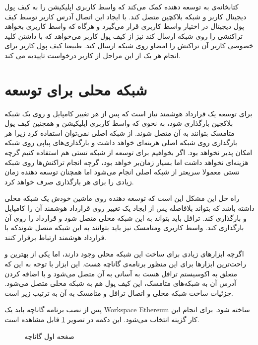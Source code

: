 کتابخانه‌ی
به توسعه دهنده کمک می‌کند که واسط کاربری اپلیکیشن را به کیف پول دیجیتال کاربر و شبکه بلاکچین متصل کند.
با ایجاد این اتصال آدرس کاربر توسط کیف پول دیجیتال در اختیار واسط کاربری قرار می‌گیرد
و هرگاه که واسط کاربری بخواهد تراکنشی را روی شبکه ارسال کند نیز از کیف پول کاربر می‌خواهد
که با داشتن کلید خصوصی کاربر آن تراکنش را امضاو روی شبکه ارسال کند.
طبیعتا کیف پول کاربر برای انجام هر یک از این مراحل از کاربر درخواست تاییدیه می کند.


\section{شبکه محلی برای توسعه}
برای توسعه یک قرارداد هوشمند نیاز است که پس از هر تغییر کامپایل و روی یک شبکه بلاکچین بارگذاری شود،
به نحوی که واسط کاربری اپلیکیشن و همچنین کیف پول متامسک بتوانند به آن متصل شوند.
از شبکه اصلی نمی‌توان استفاده کرد زیرا هر بارگذاری روی شبکه اصلی هزینه‌ای خواهد داشت
و بارگذاری‌های پیاپی روی شبکه امکان پذیر نخواهد بود.
اگر بخواهیم برای توسعه از شبکه تستی هم استفاده کنیم گرچه هزینه‌ای نخواهد داشت اما بسیار زمان‌بر خواهد بود،
گرچه انجام تراکنش‌ها روی شبکه تستی معمولا سریعتر از شبکه اصلی انجام می‌شود
اما همچنان توسعه دهنده زمان زیادی را برای هر بارگذاری صرف خواهد کرد.

راه حل این مشکل این است که توسعه دهنده روی ماشین خودش یک شبکه محلی داشته باشد
که بتواند بلافاصله پس از ایجاد یک تغییر روی قرارداد هوشمند آن را کامپایل و بارگذاری کند.
ترافل باید بتواند به این شبکه محلی متصل شود و قرارداد را روی آن بارگذاری کند.
واسط کاربری ومتامسک نیز باید بتوانند به این شبکه متصل شوندکه با قرارداد هوشمند ارتباط برقرار کنند.

اگرچه ابزارهای زیادی برای ساخت این شبکه محلی وجود دارند،
اما یکی از بهترین و راحت‌ترین ابزارها برای این منظور برنامه‌ی گاناچه هست.
این ابزار با توجه به این که متعلق به اکوسیستم ترافل هست
به آسانی به آن متصل می‌شود و با اضافه کردن آدرس آن به شبکه‌های متامسک،
این کیف پول هم به شبکه محلی متصل می‌شود. جزئیات ساخت شبکه محلی و اتصال ترافل و متامسک به آن به ترتیب زیر است.

پس از نصب برنامه گاناچه باید یک
\gls{Workspace}
\gls{Ethereum}
ساخته شود. برای انجام این کار گزینه
انتخاب می‌شود. این دکمه در تصویر
\ref{fig:ganache-1}
قابل مشاهده است.

\begin{figure}[H]
\centerline{}
\caption{صغحه اول گاناچه}
\label{fig:ganache-1}
\end{figure}

